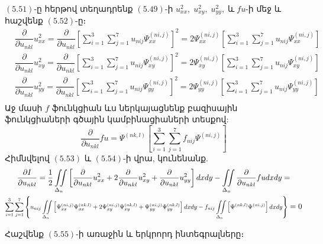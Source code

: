 \documentclass[fleqn, bachelor,subf,12pt,notitlepage]{article}
\newcommand\scalemath[2]{\scalebox{#1}{\mbox{\ensuremath{\displaystyle #2}}}}
\begin{document}
$(5.51)$-ը հերթով տեղադրենք $(5.49)$-ի $u_{xx}^{2}, \; u_{xy}^{2}, \; u_{yy}^{2}, \; \text{և} \; f u$-ի մեջ և հաշվենք $(5.52)$-ը։
\begin{equation}
\begin{aligned}
&\dfrac{\partial}{ \partial u_{nkl}}u_{xx}^2 = \dfrac{\partial}{ \partial u_{nkl}}\left[\sum_{i=1}^{3}\sum_{j=1}^{7}u_{nij}\Psi^{(ni,j)}_{xx}\right]^{2} = 2\Psi^{(ni,j)}_{xx}\left[\sum_{i=1}^{3}\sum_{j=1}^{7}u_{nij}\Psi^{(ni,j)}_{xx}\right] \\
&\dfrac{\partial}{ \partial u_{nkl}}u_{xy}^2 = \dfrac{\partial}{ \partial u_{nkl}}\left[\sum_{i=1}^{3}\sum_{j=1}^{7}u_{nij}\Psi^{(ni,j)}_{xy}\right]^{2} = 2\Psi^{(ni,j)}_{xy}\left[\sum_{i=1}^{3}\sum_{j=1}^{7}u_{nij}\Psi^{(ni,j)}_{xy}\right] \\
&\dfrac{\partial}{ \partial u_{nkl}}u_{yy}^2 = \dfrac{\partial}{ \partial u_{nkl}}\left[\sum_{i=1}^{3}\sum_{j=1}^{7}u_{nij}\Psi^{(ni,j)}_{yy}\right]^{2} = 2\Psi^{(ni,j)}_{yy}\left[\sum_{i=1}^{3}\sum_{j=1}^{7}u_{nij}\Psi^{(ni,j)}_{yy}\right] \\
\end{aligned}
\end{equation}
Աջ մասի $f$ ֆունկցիան ևս ներկայացնենք բազիսային ֆունկցիաների գծային կամբինացիաների տեսքով:
\begin{equation}
\dfrac{\partial}{ \partial u_{nkl}}fu = \Psi^{(nk,l)}\left[\sum_{i=1}^{3}\sum_{j=1}^{7}f_{nij}\Psi^{(ni,j)}\right]
\end{equation}
Հիմնվելով $(5.53)$ և $(5.54)$-ի վրա, կունենանք.
\begin{equation}
\begin{gathered}
\dfrac{\partial I}{ \partial u_{nkl}} = \frac{1}{2}\iint \limits_{\Delta_{n}} \left[\dfrac{\partial}{ \partial u_{nkl}}u_{xx}^2 + 2\dfrac{\partial}{ \partial u_{nkl}}u_{xy}^2 + \dfrac{\partial}{ \partial u_{nkl}}u_{yy}^2 \right]dxdy - \iint \limits_{\Delta_{n}} \dfrac{\partial}{ \partial u_{nkl}}fudxdy = \\
\scalemath{0.8}{
\sum_{i=1}^{3}\sum_{j=1}^{7}\left\{u_{nij}\iint \limits_{\Delta_{n}}\left[\Psi^{(ni,j)}_{xx}\Psi^{(nk,l)}_{xx} + 2\Psi^{(ni,j)}_{xy}\Psi^{(nk,l)}_{xy} + \Psi^{(ni,j)}_{yy}\Psi^{(nk,l)}_{yy}\right]dxdy - f_{nij}\iint \limits_{\Delta_{n}} \left[\Psi^{(nk,l)}\Psi^{(ni,j)}\right]dxdy\right\}}=0
\end{gathered}
\end{equation}

Հաշվենք $(5.55)$-ի առաջին և երկրորդ ինտեգրալները։
\end{document}
